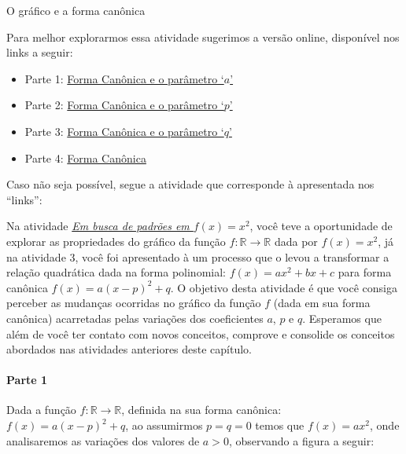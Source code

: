 \label{\detokenize{AF209-5:sec-funcao-quadratica-parametros-grafico}}\label{\detokenize{AF209-5::doc}}\label{\detokenize{AF209-5:explorando-os-parametros-da-forma-canonica-e-o-grafico-da-funcao-quadratica}}\label{\detokenize{AF209-5:ativ-funcao-quadratica-graf-curva}}
\begin{task}{O gráfico e a forma canônica}



Para melhor explorarmos essa atividade sugerimos a versão online, disponível nos links a seguir:
\begin{itemize}
\item {} 
Parte 1: \href{https://ggbm.at/jdFEcyav}{Forma Canônica e o parâmetro ‘$a$’}

\item {} 
Parte 2: \href{https://ggbm.at/DmKxRtU9}{Forma Canônica e o parâmetro ‘$p$’}

\item {} 
Parte 3: \href{https://ggbm.at/Qcm5QFjH}{Forma Canônica e o parâmetro ‘$q$’}

\item {} 
Parte 4: \href{https://ggbm.at/jVJh78hz}{Forma Canônica}

\end{itemize}

Caso não seja possível, segue a atividade que corresponde à apresentada nos “links”:

Na atividade \hyperref[\detokenize{AF209-2:ativ-funcao-quadratica-investigando-x-a-2}]{\textit{Em busca de padrões em \(f(x)=x^2\)}}, você teve a oportunidade de explorar as propriedades do gráfico da função \(f:\mathbb{R}\to\mathbb{R}\) dada por \(f(x)=x^2\), já na atividade 3, você foi apresentado à um processo que o levou a transformar a relação quadrática dada na forma polinomial: \(f(x)=ax^2 + bx + c\) para forma canônica \(f(x)=a(x-p)^2+q\). O objetivo desta atividade é que você consiga perceber as mudanças ocorridas no gráfico da função \(f\) (dada em sua forma canônica) acarretadas pelas variações dos coeficientes \(a\), \(p\) e \(q\). Esperamos que além de você ter contato com novos conceitos, comprove e consolide os conceitos abordados nas atividades anteriores deste capítulo.

\paragraph{Parte 1}

Dada a função \(f:\mathbb{R}\to\mathbb{R}\), definida na sua forma canônica: \(f(x)=a(x-p)^2+q\), ao assumirmos \(p=q=0\) temos que \(f(x)=ax^2\), onde analisaremos as variações dos valores de \(a>0\), observando a figura a seguir:
\vfill
\begin{figure}[H]
\centering


\end{figure}
\end{task}
